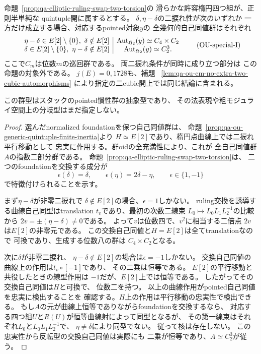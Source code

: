 \begin{proposition}[二つの二捩れ特別座での全pointed慣性群の型]
\label{prop:qa-elliptic-special-inertia-group-types}
命題~\ref{prop:qa-elliptic-ruling-swap-two-torsion}の
滑らかな許容楕円四つ組が、正則半単純な
quintuple開に属するとする。
$\delta,\eta-\delta$の二捩れ性が次のいずれか
一方だけ成立する場合、対応するpointed対象$y$の
全幾何的自己同値群はそれぞれ
\[
 \begin{array}{c|c}
 \eta-\delta\in E[2]\setminus\{0\},\
 \delta\notin E[2] &\operatorname{Aut}_{\mathfrak H_2}(y)\simeq C_4\times C_2\\
 \delta\in E[2]\setminus\{0\},\
 \eta-\delta\notin E[2] &\operatorname{Aut}_{\mathfrak H_2}(y)\simeq C_2^3 .
 \end{array}
 \tag{OU-special-I}\label{eq:qa-ou-special-inertia-group-types}
\]
ここで$C_m$は位数$m$の巡回群である。
両二捩れ条件が同時に成り立つ部分は
この命題の対象外である。
$j(E)=0,1728$も、補題
~\ref{lem:qa-ou-cm-no-extra-two-cubic-automorphisms}
により指定の二cubic開上では同じ結論に含まれる。

この群型はスタックのpointed慣性群の抽象型であり、
その法表現や粗モジュライ空間上の分岐型はまだ指定しない。
\end{proposition}
\begin{proof}
選んだnormalized foundationを保つ自己同値群は、
命題~\ref{prop:qa-ou-generic-quintuple-finite-inertia}より
$H\simeq E[2]$であり、楕円点曲線上では二捩れ平行移動として
忠実に作用する。群oidの全充満性により、これが
全自己同値群$A$の指数二部分群である。
命題~\ref{prop:qa-elliptic-ruling-swap-two-torsion}は、
二つのfoundationを交換する成分が
\[
 \epsilon(\delta)=\delta,\qquad
 \epsilon(\eta)=2\delta-\eta,\qquad \epsilon\in\{1,-1\}
\]
で特徴付けられることを示す。

まず$\eta-\delta$が非零二捩れで
$\delta\notin E[2]$の場合、$\epsilon=1$しかない。
ruling交換を誘導する曲線自己同型はtranslation
$t_v$であり、最初の次数二線束
$L_0\mapsto L_0L_1L_2^{-1}$の比較から
$2v=\pm(\eta-\delta)\ne0$である。
よって$v$は位数四で、$v^2$に相当する二倍点
$2v$は$E[2]$の非零元である。
この交換自己同値と$H=E[2]$は全てtranslationなので
可換であり、生成する位数八の群は
$C_4\times C_2$となる。

次に$\delta$が非零二捩れ、
$\eta-\delta\notin E[2]$の場合は$\epsilon=-1$しかない。
交換自己同値の曲線上の作用は$t_v\circ[-1]$であり、
その二乗は恒等である。
$E[2]$の平行移動と共役したときの線型作用は
$-1$だが、$E[2]$上では恒等である。
したがってその交換自己同値は$H$と可換で、
位数二を持つ。
以上の曲線作用がpointed自己同値を忠実に検出することを
確認する。$H$上の作用は平行移動の忠実性で検出できる。
もし$A$の元が曲線上恒等でありながらfoundationを交換するなら、
対応する四つ組$U$と$R(U)$が恒等曲線射によって同型となるが、
その第一線束はそれぞれ$L_0$と$L_0L_1L_2^{-1}$で、
$\eta\ne\delta$により同型でない。
従って核は存在しない。
この忠実性から反転型の交換自己同値は実際にも
二乗が恒等であり、$A\simeq C_2^3$が従う。
\end{proof}

